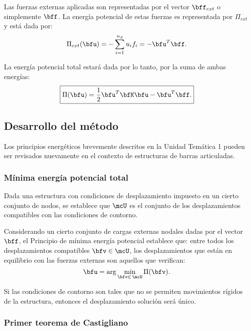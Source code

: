 Las fuerzas externas aplicadas son representadas por el vector $\bff_{ext}$ o simplemente $\bff$. %
%
La energía potencial de estas fuerzas es representada por $\Pi_{ext}$ y está dada por:
%
\begin{equation}
 \Pi_{ext}(\bfu) = - \sum_{i=1}^{n_d} u_i f_i = - \bfu^T \bff .
\end{equation}
%

La energía potencial total estará dada por lo tanto, por la suma de ambas energías:
%
\begin{equation}
\boxed{
\Pi(\bfu) = \frac{1}{2} \bfu^T \bfK \bfu - \bfu^T \bff .
}
\end{equation}



\subsection{Desarrollo del método}

Los principios energéticos brevemente descritos en la Unidad Temática 1 pueden ser revisados nuevamente en el contexto de estructuras de barras articuladas.


\subsubsection{Mínima energía potencial total}

Dada una estructura con condiciones de desplazamiento impuesto en un cierto conjunto de nodos, se establece que $\mcU$ es el conjunto de los desplazamientos compatibles con las condiciones de contorno. %
%


Considerando un cierto conjunto de cargas externas nodales dadas por el vector $\bff$, el Principio de mínima energía potencial establece que: entre todos los desplazamientos compatibles $\bfv \in \mcU$, los desplazamientos que están en equilibrio con las fuerzas externas son aquellos que verifican:
%
\begin{equation}
\bfu = \arg\min_{\bfv \in \, \mcU} \Pi(\bfv).
\end{equation}

Si las condiciones de contorno son tales que no se permiten movimientos rígidos de la estructura, entonces el desplazamiento solución será único.


\subsubsection{Primer teorema de Castigliano}

